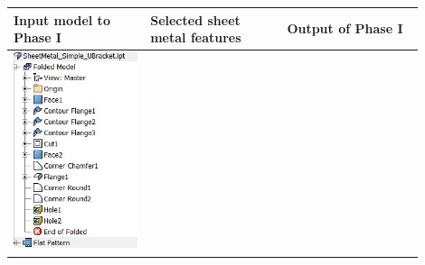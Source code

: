 \begin{minipage}[t]{\linewidth}
\begin{tabular}[h]{@{} p{0.3\linewidth} p{0.3\linewidth}  p{0.3\linewidth}@{}} \toprule

\textbf{Input model to Phase I} & \textbf{Selected sheet metal features} & \textbf{Output of Phase I} \\ \midrule

\includegraphics[width=0.92\linewidth]{..//Common/images/DefeatPhase_I_t1} &

\end{tabular}
\end{minipage}
